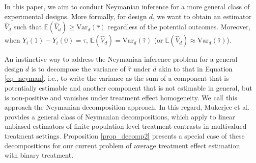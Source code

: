 \documentclass[12pt]{article}
\newcommand{\Var}{{\text{Var}}}
\newcommand{\E}{{\mathbb{E}}}
\begin{document}
In this paper, we aim to conduct Neymanian inference for a more general class of experimental designs. More formally, for design $d$, we want to obtain an estimator $\hat{V}_d$ such that $\E(\hat{V}_d) \geq \Var_d(\hat{\tau})$ regardless of the potential outcomes. Moreover, when $Y_i(1) - Y_i(0) = \tau$, $\E(\hat{V}_d) = \Var_d(\hat{\tau})$ (or $\E(\hat{V}_d) \approx \Var_d(\hat{\tau})$).


An instinctive way to address the Neymanian inference problem for a general design $d$ is to decompose the variance of $\hat{\tau}$ under $d$ akin to that in Equation \ref{eq_neyman}, i.e., to write the variance as the sum of a component that is potentially estimable and another component that is not estimable in general, but is non-positive and vanishes under treatment effect homogeneity.
We call this approach the Neymanian decomposition approach. 
In this regard, Mukerjee et al. \cite{mukerjee2018using} provides a general class of Neymanian decompositions, which apply to linear unbiased estimators of finite population-level treatment contrasts in multivalued treatment settings. Proposition \ref{prop_decomp2} presents a special case of these decompositions for our current problem of average treatment effect estimation with binary treatment.
\end{document}
